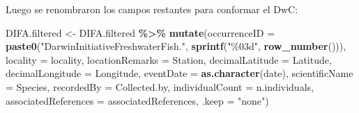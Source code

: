 \documentclass[sn-apa,pdflatex]{sn-jnl}
\newenvironment{Shaded}{\begin{snugshade}}{\end{snugshade}}
\newcommand{\AttributeTok}[1]{\textcolor[rgb]{0.13,0.29,0.53}{#1}}
\newcommand{\CommentTok}[1]{\textcolor[rgb]{0.56,0.35,0.01}{\textit{#1}}}
\newcommand{\FunctionTok}[1]{\textcolor[rgb]{0.13,0.29,0.53}{\textbf{#1}}}
\newcommand{\NormalTok}[1]{#1}
\newcommand{\OtherTok}[1]{\textcolor[rgb]{0.56,0.35,0.01}{#1}}
\newcommand{\SpecialCharTok}[1]{\textcolor[rgb]{0.81,0.36,0.00}{\textbf{#1}}}
\newcommand{\StringTok}[1]{\textcolor[rgb]{0.31,0.60,0.02}{#1}}
\begin{document}
\begin{Shaded}
\end{Shaded}

Luego se renombraron los campos restantes para conformar el DwC:

\begin{Shaded}
\begin{Highlighting}[]
\NormalTok{DIFA.filtered }\OtherTok{\textless{}{-}}\NormalTok{ DIFA.filtered }\SpecialCharTok{\%\textgreater{}\%}
    \FunctionTok{mutate}\NormalTok{(}\AttributeTok{occurrenceID =} \FunctionTok{paste0}\NormalTok{(}\StringTok{"DarwinInitiativeFreshwaterFish."}\NormalTok{,}
        \FunctionTok{sprintf}\NormalTok{(}\StringTok{"\%03d"}\NormalTok{, }\FunctionTok{row\_number}\NormalTok{())), }\AttributeTok{locality =}\NormalTok{ locality,}
        \AttributeTok{locationRemarks =}\NormalTok{ Station, }\AttributeTok{decimalLatitude =}\NormalTok{ Latitude,}
        \AttributeTok{decimalLongitude =}\NormalTok{ Longitude, }\AttributeTok{eventDate =} \FunctionTok{as.character}\NormalTok{(date),}
        \AttributeTok{scientificName =}\NormalTok{ Species, }\AttributeTok{recordedBy =}\NormalTok{ Collected.by,}
        \AttributeTok{individualCount =}\NormalTok{ n.individuals, }\AttributeTok{associatedReferences =}\NormalTok{ associatedReferences,}
        \AttributeTok{.keep =} \StringTok{"none"}\NormalTok{)}
\end{Highlighting}
\end{Shaded}
\end{document}
